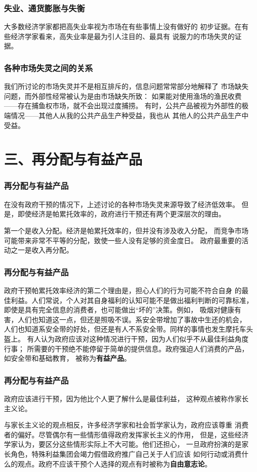 \documentclass[aspectratio=169, 12pt]{beamer}
\begin{document}
\begin{frame}[plain]
    \frametitle{失业、通货膨胀与失衡}
    大多数经济学家都把高失业率视为市场在有些事情上没有做好的
    初步证据。在有些经济学家看来，高失业率是最为引人注目的、最具有
    说服力的市场失灵的证据。
\end{frame}

\begin{frame}[plain]
    \frametitle{各种市场失灵之间的关系}
    我们所讨论的市场失灵并不是相互排斥的，信息问题常常部分地解释了
    市场缺失问题，而外部性经常被认为是由市场缺失所致：
    如果能对使用渔场的渔民收费——存在捕鱼权市场，就不会出现过度捕捞。
    有时，公共产品被视为外部性的极端情况——其他人从我的公共产品生产种受益，我也从
    其他人的公共产品生产中受益。
\end{frame}

\section{三、再分配与有益产品}

\begin{frame}[plain]
    \frametitle{再分配与有益产品}
    在没有政府干预的情况下，上述讨论的各种市场失灵来源导致了经济低效率。
    但是，即使经济是帕累托效率的，政府进行干预还有两个更深层次的理由。
    \par
    第一个是收入分配。经济是帕累托效率的，但并没有涉及收入分配，
    而竞争市场可能带来非常不平等的分配，致使一些人没有足够的资金度日。
    政府最重要的活动之一是收入再分配。
\end{frame}

\begin{frame}[plain]
    \frametitle{再分配与有益产品}
    政府干预帕累托效率经济的第二个理由是，担心人们的行为可能不符合自身
    的最佳利益。人们常说，个人对其自身福利的认知可能不是做出福利判断的可靠标准，
    即使是具有完全信息的消费者，也可能做出“坏的”决策。例如，
    吸烟对健康有害，人们也知道这一点，但还是照吸不误。系安全带增加了事故中生还的机会，
    人们也知道系安全带的好处，但还是有人不系安全带。同样的事情也发生摩托车头盔上。
    有人认为政府应该对这种情况进行干预，因为人们似乎不从最佳利益角度行事；
    所需要的干预绝不能停留于简单的提供信息。政府强迫人们消费的产品，如安全带和基础教育，
    被称为\textbf{有益产品}。
\end{frame}

\begin{frame}[plain]
    \frametitle{再分配与有益产品}
    政府应该进行干预，因为他比个人更了解什么是最佳利益，
    这种观点被称作家长主义论。
    \par
    与家长主义论的观点相反，许多经济学家和社会哲学家认为，政府应该尊重
    消费者的偏好。尽管偶尔有一些情形值得政府发挥家长主义的作用，
    但是，这些经济学家认为，要区分这些情形实际上不大可能。他们还担心，
    一旦政府扮演的是家长角色，特殊利益集团会竭力假借政府推广自己关于人们应该
    如何行动或消费什么的观点。政府不应该干预个人选择的观点有时被称为\textbf{自由意志论}。
\end{frame}
\end{document}
